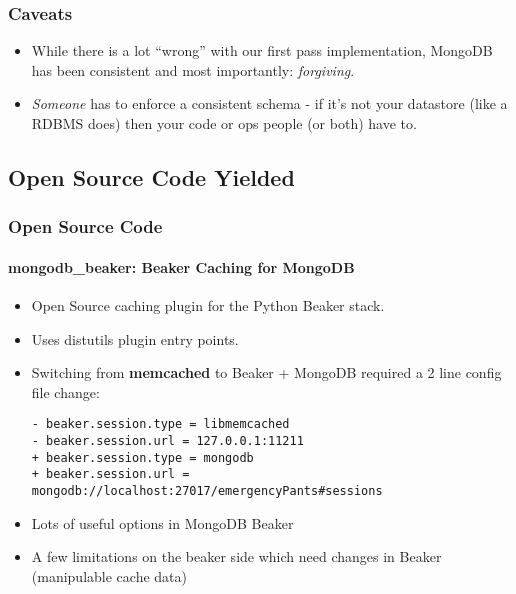 \documentclass{beamer}
\begin{document}
\begin{frame}
\frametitle{Caveats}
\begin{itemize}
	
	\item While there is a lot ``wrong'' with our first pass implementation, MongoDB has been consistent and most importantly: {\em forgiving}.
	\item {\em Someone} has to enforce a consistent schema - if it's not your datastore (like a RDBMS does) then your code or ops people (or both) have to.

\end{itemize}
\end{frame}

\subsection[Code Produced]{Open Source Code Yielded}

\begin{frame}[fragile]
\frametitle{Open Source Code}
\framesubtitle{mongodb\_beaker: Beaker Caching for MongoDB}
\begin{itemize}
	\item Open Source caching plugin for the Python Beaker stack.  
	\item Uses distutils plugin entry points.
	\item<2-> Switching from {\bf memcached} to Beaker + MongoDB required a 2 line config file change:
	\begin{lstlisting}
- beaker.session.type = libmemcached
- beaker.session.url = 127.0.0.1:11211
+ beaker.session.type = mongodb
+ beaker.session.url = mongodb://localhost:27017/emergencyPants#sessions
	\end{lstlisting}
	\item<3-> Lots of useful options in MongoDB Beaker
	\item<3-> A few limitations on the beaker side which need changes in Beaker (manipulable cache data)
\end{itemize}
\end{frame}
\end{document}
